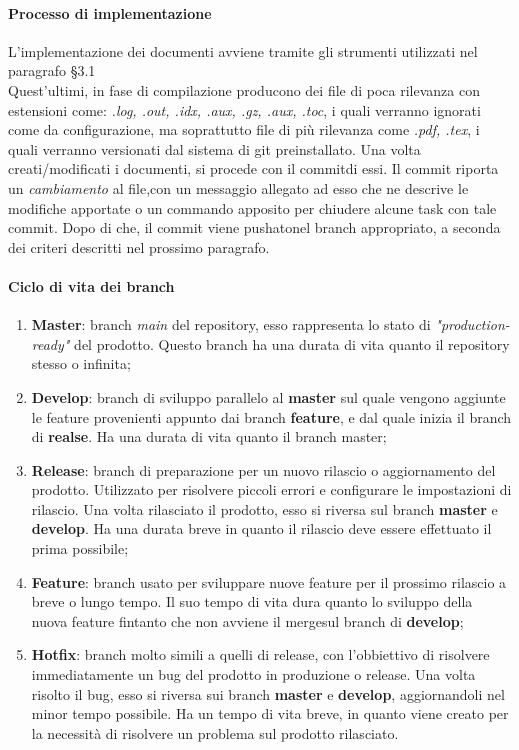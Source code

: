 	\paragraph{Processo di implementazione}
L'implementazione dei documenti avviene tramite gli strumenti utilizzati nel paragrafo §3.1\\
Quest'ultimi, in fase di compilazione producono dei file di poca rilevanza con estensioni come: \textit{.log, .out, .idx, .aux, .gz, .aux, .toc},
i quali verranno ignorati come da configurazione, ma soprattutto file di più rilevanza
come \textit{.pdf, .tex}, i quali verranno versionati dal sistema di git preinstallato.  
Una volta creati/modificati i documenti, si procede con il commit\glossario di essi. Il commit riporta un \textit{cambiamento} al file,con un messaggio allegato ad esso che ne 
descrive le modifiche apportate o un commando apposito per chiudere alcune task con tale commit. Dopo di che, il commit viene pushato\glossario nel branch appropriato, 
a seconda dei criteri descritti nel prossimo paragrafo. 

\paragraph{Ciclo di vita dei branch}
\begin{enumerate}
	
	\item \textbf{Master}: branch \textit{main} del repository, esso rappresenta lo stato di \textit{"production-ready"} del prodotto. Questo branch ha una durata di vita quanto il repository stesso o infinita;
	\item \textbf{Develop}: branch di sviluppo parallelo al \textbf{master} sul quale vengono aggiunte le feature provenienti appunto dai branch \textbf{feature},
	 e dal quale inizia il branch di \textbf{realse}. Ha una durata di vita quanto il branch master;
	 
	\item \textbf{Release}: branch di preparazione per un nuovo rilascio o aggiornamento del prodotto. 
	Utilizzato per risolvere piccoli errori e configurare le impostazioni di rilascio. Una volta rilasciato il 
	prodotto, esso si riversa sul branch \textbf{master} e \textbf{develop}. Ha una durata breve in quanto il rilascio deve essere effettuato il prima possibile;

	\item \textbf{Feature}: branch usato per sviluppare nuove feature per il prossimo rilascio a breve o lungo tempo. Il suo tempo di vita dura quanto lo sviluppo della nuova feature
	fintanto che non avviene il merge\glossario sul branch di \textbf{develop};

	\item \textbf{Hotfix}: branch molto simili a quelli di release, con l'obbiettivo di risolvere immediatamente un bug del prodotto in produzione o release. Una volta risolto il bug, 
	esso si riversa sui branch \textbf{master} e \textbf{develop}, aggiornandoli nel minor tempo possibile. Ha un tempo di vita breve, in quanto viene creato per la necessità di risolvere 
	un problema sul prodotto rilasciato. 
	
\end{enumerate}

